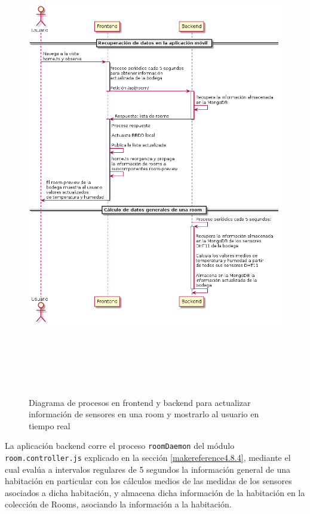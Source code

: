 \begin{figure}[hbt!]
\centering
\label{fig:usecase3sub2}
\includegraphics[height=8in]{figures/diagrams/use-cases/sensorInfo2.png}
\caption[usecase3sub2]{Diagrama de procesos en frontend y backend para actualizar información de sensores en una room y mostrarlo al usuario en tiempo real\footnotemark}
\end{figure}

La aplicación backend corre el proceso \verb|roomDaemon| del módulo \verb|room.controller.js| explicado en la sección \ref{makereference4.8.4}, mediante el cual evalúa a intervalos regulares de 5 segundos la información general de una habitación en particular con los cálculos medios de las medidas de los sensores asociados a dicha habitación, y almacena dicha información de la habitación en la colección de Rooms, asociando la información a la habitación.

